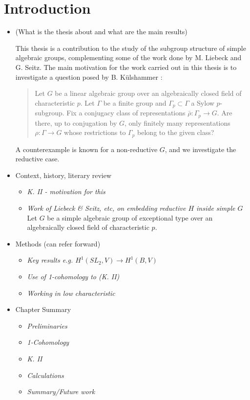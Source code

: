 
\chapter{Introduction}
\label{Chapter1}

\begin{itemize}
\item (What is the thesis about and what are the main results)

This thesis is a contribution to the study of the subgroup structure of simple algebraic groups, complementing some of the work done by M. Liebeck and G. Seitz. The main motivation for the work carried out in this thesis is to investigate a question posed by B. K\"ulshammer \cite{weil1964remarks}:
\begin{quote}
	Let $G$ be a linear algebraic group over an algebraically closed field of characteristic $p$. Let $\Gamma$ be a finite group and $\Gamma_p\subset\Gamma$ a Sylow $p$-subgroup. Fix a conjugacy class of representations $\bar{\rho}:\Gamma_p\rightarrow G$. Are there, up to conjugation by $G$, only finitely many representations $\rho:\Gamma\rightarrow G$ whose restrictions to $\Gamma_p$ belong to the given class?
\end{quote}
A counterexample is known for a non-reductive $G$, and we investigate the reductive case.



\item Context, history, literary review
\begin{itemize}
	\item \emph{K. II - motivation for this}
	\item \emph{Work of Liebeck \& Seitz, etc, on embedding reductive $H$ inside simple $G$}
	Let $G$ be a simple algebraic group of exceptional type over an algebraically closed field of characteristic $p$. 
\end{itemize}
\item Methods (can refer forward)
\begin{itemize}
	\item \emph{Key results e.g. $H^1(SL_2, V)\rightarrow H^1(B, V)$}
	\item \emph{Use of 1-cohomology to (K. II)}
	\item \emph{Working in low characteristic}
\end{itemize}
\item Chapter Summary
\begin{itemize}
	\item \emph{Preliminaries}
	\item \emph{1-Cohomology}
	\item \emph{K. II}
	\item \emph{Calculations}
	\item \emph{Summary/Future work}
\end{itemize}
\end{itemize}

